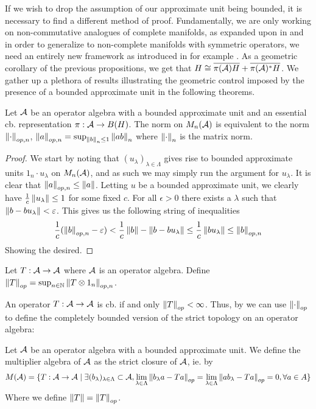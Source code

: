 If we wish to drop the assumption of our approximate unit being bounded, it is necessary to find a different method of proof. Fundamentally, we are only working on non-commutative analogues of complete manifolds, as expanded upon in \cite[Section 2]{mesrennie} and in order to generalize to non-complete manifolds with symmetric operators, we need an entirely new framework as introduced in for example \cite{kaad}. 
As a geometric corollary of the previous propositions, we get that $H\cong \overline{\pi(\mathcal{A})H}+\overline{\pi(\mathcal{A})^*H}$. 
We gather up a plethora of results illustrating the geometric control imposed by the presence of a bounded approximate unit in the following theorems. 
\begin{theorem}\label{mesrennie112}
	Let $\mathcal{A}$ be an operator algebra with a bounded approximate unit and an essential cb. representation $\pi:\mathcal{A}\to B(H)$. The norm on $M_n(\mathcal{A})$ is equivalent to the norm $\left \Vert \cdot \right \Vert_{op,n}$, $\left \Vert a \right \Vert_{op,n}=\sup_{\left \Vert b \right \Vert_n\leq 1}\left \Vert ab \right \Vert_n$ where $\left \Vert \cdot \right \Vert_n$ is the matrix norm. 
\end{theorem}
\begin{proof}
	We start by noting that $(u_\lambda)_{\lambda\in \Lambda}$ gives rise to bounded approximate units $1_n \cdot u_\lambda$ on $M_n(\mathcal{A})$, and as such we may simply run the argument for $u_\lambda$.
	It is clear that $\left \Vert a \right \Vert_{op,n}\leq \left \Vert a \right \Vert$. Letting $u$ be a bounded approximate unit, we clearly have $\frac{1}{c}\left \Vert u_{\lambda} \right \Vert\leq 1$ for some fixed $c$. For all $\epsilon>0$ there exists a $\lambda$ such that $\left \Vert b-bu_\lambda \right \Vert<\varepsilon$. This gives us the following string of inequalities
	\begin{align*}
		\frac{1}{c}(\left \Vert b \right \Vert_{op,n}-\varepsilon)<\frac{1}{c}\left \Vert b \right \Vert-\left \Vert b-bu_\lambda \right \Vert\leq \frac{1}{c} \left \Vert bu_\lambda \right \Vert \leq \left \Vert b \right \Vert_{op,n}
	\end{align*}
	Showing the desired. 
\end{proof}
\begin{definition}
	Let $T:\mathcal{A}\to \mathcal{A}$ where $\mathcal{A}$ is an operator algebra. Define $\left \Vert T \right \Vert_{op}=\sup_{n \in \mathbb{N}} \left \Vert T\otimes 1_n \right \Vert_{op,n}$. 
\end{definition}
An operator $T:\mathcal{A}\to \mathcal{A}$ is cb. if and only $\left \Vert T \right \Vert_{op}<\infty$. Thus, by  we can use $\left \Vert \cdot \right \Vert_{op}$ to define the completely bounded version of the strict topology on an operator algebra: 
\begin{definition}
	Let $\mathcal{A}$ be an operator algebra with a bounded approximate unit. We define the multiplier algebra of $\mathcal{A}$ as the strict closure of $\mathcal{A}$, ie. by
	\begin{align*}
		M(\mathcal{A})=\{T:\mathcal{A}\to \mathcal{A}\mid \exists (b_\lambda)_{\lambda \in \Lambda}\subset \mathcal{A}, \lim_{\lambda \in \Lambda} \left \Vert b_\lambda a-Ta \right \Vert_{op}=\lim_{\lambda \in \Lambda}\left \Vert ab_\lambda-T a \right \Vert_{op}=0, \forall a \in A\}
	\end{align*}
	Where we define $\left \Vert T \right \Vert=\left \Vert T \right \Vert_{op}$. 
\end{definition}

